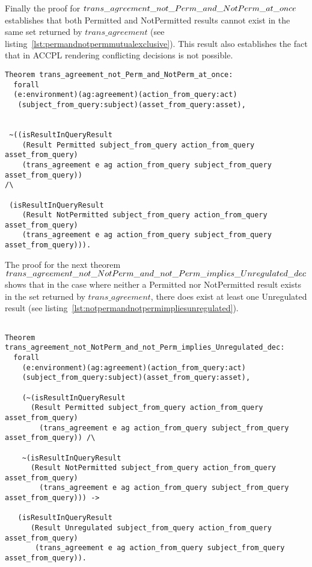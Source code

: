 Finally the proof for $trans\_agreement\_not\_Perm\_and\_ \newline NotPerm\_at\_once$ establishes that both Permitted and NotPermitted results cannot exist in the same set returned by $trans\_agreement$ (see listing~\ref{lst:permandnotpermmutualexclusive}). This result also establishes the fact that in \ac{ACCPL} rendering conflicting decisions is not possible. 

\begin{lstlisting}
Theorem trans_agreement_not_Perm_and_NotPerm_at_once:
  forall
  (e:environment)(ag:agreement)(action_from_query:act)
   (subject_from_query:subject)(asset_from_query:asset),


 ~((isResultInQueryResult 
    (Result Permitted subject_from_query action_from_query asset_from_query)
    (trans_agreement e ag action_from_query subject_from_query asset_from_query)) 
/\

 (isResultInQueryResult 
    (Result NotPermitted subject_from_query action_from_query asset_from_query)
    (trans_agreement e ag action_from_query subject_from_query asset_from_query))).

\end{lstlisting}

The proof for the next theorem $trans\_agreement\_not\_NotPerm\_and\_not\_Perm \newline \_implies\_Unregulated\_dec$ shows that in the case where neither a Permitted nor NotPermitted result exists in the set returned by $trans\_agreement$, there does exist at least one Unregulated result (see listing~\ref{lst:notpermandnotpermimpliesunregulated}).

\begin{lstlisting}

Theorem trans_agreement_not_NotPerm_and_not_Perm_implies_Unregulated_dec:
  forall
    (e:environment)(ag:agreement)(action_from_query:act)
    (subject_from_query:subject)(asset_from_query:asset),

    (~(isResultInQueryResult 
      (Result Permitted subject_from_query action_from_query asset_from_query)
        (trans_agreement e ag action_from_query subject_from_query asset_from_query)) /\

    ~(isResultInQueryResult 
      (Result NotPermitted subject_from_query action_from_query asset_from_query)
        (trans_agreement e ag action_from_query subject_from_query asset_from_query))) ->

   (isResultInQueryResult 
      (Result Unregulated subject_from_query action_from_query asset_from_query)
       (trans_agreement e ag action_from_query subject_from_query asset_from_query)).
\end{lstlisting}


